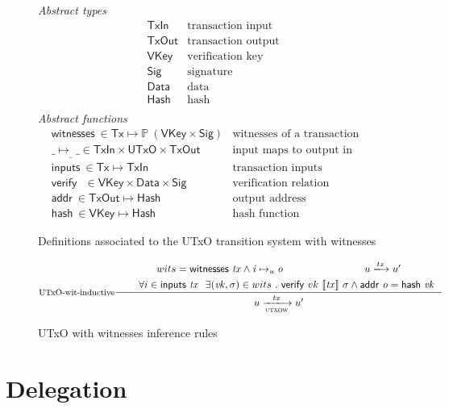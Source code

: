 \documentclass[11pt,a4paper]{article}
\newcommand{\powerset}[1]{\mathbb{P}~#1}
\newcommand{\var}[1]{\mathit{#1}}
\newcommand{\fun}[1]{\mathsf{#1}}
\newcommand{\type}[1]{\mathsf{#1}}
\newcommand{\trans}[2]{\xlongrightarrow[\textsc{#1}]{#2}}
\newcommand{\Tx}{\type{Tx}}
\newcommand{\UTxO}{\type{UTxO}}
\newcommand{\TxIn}{\type{TxIn}}
\newcommand{\TxOut}{\type{TxOut}}
\newcommand{\VKey}{\type{VKey}}
\newcommand{\Sig}{\type{Sig}}
\newcommand{\Data}{\type{Data}}
\newcommand{\Hash}{\type{Hash}}
\newcommand{\inputs}[1]{\fun{inputs}\ \var{#1}}
\newcommand{\witnesses}[1]{\fun{witnesses}\ \var{#1}}
\newcommand{\verify}[3]{\fun{verify} ~ #1 ~ #2 ~ #3}
\newcommand{\serialised}[1]{\llbracket \var{#1} \rrbracket}
\newcommand{\addr}[1]{\fun{addr}\ \var{#1}}
\newcommand{\hash}[1]{\fun{hash}\ \var{#1}}
\newcommand{\inout}[3]{\var{#1}\mapsto_{#2}\var{#3}}
\begin{document}
\begin{figure}[h]
  \emph{Abstract types}
  \begin{align*}
    & \TxIn & \text{transaction input}\\
    & \TxOut & \text{transaction output}\\
    & \VKey & \text{verification key}\\
    & \Sig  & \text{signature}\\
    & \Data  & \text{data}\\
    & \Hash  & \text{hash}\\
  \end{align*}
  \emph{Abstract functions}
  \begin{align*}
    & \witnesses{} \in \Tx \mapsto \powerset{(\VKey \times \Sig)}
    & \text{witnesses of a transaction}\\
    & \inout{\_}{\_}{\_} \in \TxIn \times \UTxO \times \TxOut
    & \text{input maps to output in utxo}\\
    & \inputs{} \in \Tx \mapsto \TxIn
    & \text{transaction inputs}\\
    & \verify{}{}{} \in \VKey \times \Data \times \Sig
    & \text{verification relation}\\
    & \addr{} \in \TxOut \mapsto \Hash
    & \text{output address} \\
    & \hash{} \in \VKey \mapsto \Hash
    & \text{hash function}
  \end{align*}
  \caption{Definitions associated to the UTxO transition system with witnesses}
  \label{fig:state-trans-utxo-witnesses-defs}
\end{figure}

\begin{figure}[h]
  \begin{equation}
    \label{eq:utxo-witness-inductive}
    \inference[UTxO-wit-inductive]
    {wits = \witnesses{tx} \wedge \inout{i}{u}{o}
      & u \trans{}{tx} u'\\
      & \forall i \in \inputs{tx} ~ ~ \exists (\var{vk}, \sigma) \in wits ~ . ~
      \verify{vk}{\serialised{tx}}{\sigma}  \wedge \addr{o} = \hash{vk}
    }
    {u \trans{utxow}{tx} u'}
  \end{equation}
  \caption{UTxO with witnesses inference rules}
  \label{fig:rules-utxo-witnesses}
\end{figure}

\section{Delegation}
\label{sec:delegation}
\end{document}

